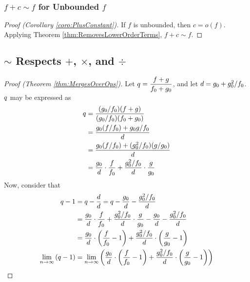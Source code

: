 \subsubsection{$f + c \sim f$ for Unbounded $f$}

\begin{proof}[Proof (Corollary \ref{coro:PlusConstant})]
	If $f$ is unbounded, then $c = o(f)$. Applying Theorem \ref{thm:RemovesLowerOrderTerms}, $f + c \sim f$.
\end{proof}

\subsection{$\sim$ Respects $+$, $\times$, and $\div$}

\begin{proof}[Proof (Theorem \ref{thm:MergesOverOps})]
	Let $q = \dfrac{f + g}{f_0 + g_0}$, and let $d = g_0 + g_0^2 / f_0$. $q$ may be expressed as
	\begin{align*}
	q &= \frac{(g_0 / f_0)(f + g)}{(g_0 / f_0)(f_0 + g_0)}\\
	&= \frac{g_0(f / f_0) + g_0g / f_0}{d}\\
	&= \frac{g_0(f / f_0) + (g_0^2 / f_0)(g / g_0)}{d}\\
	&= \frac{g_0}{d} \cdot \frac{f}{f_0} + \frac{g_0^2 / f_0}{d} \cdot \frac{g}{g_0}
	\end{align*}
	Now, consider that
	\begin{align*}
	\FuncQuotient - 1 &= \FuncQuotient - \frac{\FuncDenom}{\FuncDenom} = \FuncQuotient - \frac{\Tweak{g}}{\FuncDenom} - \frac{\Tweak{g}^2 / \Tweak{f}}{\FuncDenom}\\
	&= \frac{\Tweak{g}}{d} \cdot \frac{f}{\Tweak{f}} + \frac{\Tweak{g}^2 / \Tweak{f}}{\FuncDenom} \cdot \frac{g}{\Tweak{g}} - \frac{\Tweak{g}}{\FuncDenom} - \frac{\Tweak{g}^2 / \Tweak{f}}{\FuncDenom}\\
	&= \frac{\Tweak{g}}{d} \cdot \left( \frac{f}{\Tweak{f}} - 1 \right) + \frac{\Tweak{g}^2 / \Tweak{f}}{\FuncDenom} \cdot \left( \frac{g}{\Tweak{g}} - 1 \right)\\
	\ExprNToInfty \left( \FuncQuotient - 1 \right) &= \ExprNToInfty \left( \frac{\Tweak{g}}{d} \cdot \left( \frac{f}{\Tweak{f}} - 1 \right) + \frac{\Tweak{g}^2 / \Tweak{f}}{\FuncDenom} \cdot \left( \frac{g}{\Tweak{g}} - 1 \right) \right)\\

\end{align*}
\end{proof}
